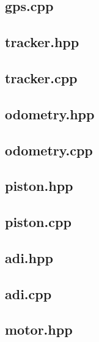 \subsection{gps.cpp}

\subsection{tracker.hpp}

\subsection{tracker.cpp}

\subsection{odometry.hpp}

\subsection{odometry.cpp}

\subsection{piston.hpp}

\subsection{piston.cpp}

\subsection{adi.hpp}

\subsection{adi.cpp}

\subsection{motor.hpp}

